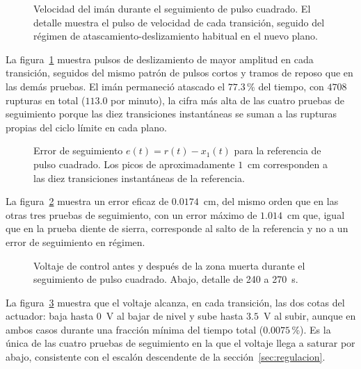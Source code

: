 \begin{figure}[ht]
    \centering
    
    \caption[Seguimiento pulso cuadrado: velocidad]{Velocidad del imán durante el seguimiento de pulso cuadrado. El detalle muestra el pulso de velocidad de cada transición, seguido del régimen de atascamiento-deslizamiento habitual en el nuevo plano.}
    \label{fig:pulso_vel}
\end{figure}

La figura~\ref{fig:pulso_vel} muestra pulsos de deslizamiento de mayor amplitud en cada transición, seguidos del mismo patrón de pulsos cortos y tramos de reposo que en las demás pruebas. El imán permaneció atascado el $77.3$\,\% del tiempo, con $4708$ rupturas en total ($113.0$ por minuto), la cifra más alta de las cuatro pruebas de seguimiento porque las diez transiciones instantáneas se suman a las rupturas propias del ciclo límite en cada plano.

\FloatBarrier

\begin{figure}[ht]
    \centering
    
    \caption[Seguimiento pulso cuadrado: error]{Error de seguimiento $e(t)=r(t)-x_1(t)$ para la referencia de pulso cuadrado. Los picos de aproximadamente $1$~cm corresponden a las diez transiciones instantáneas de la referencia.}
    \label{fig:pulso_error}
\end{figure}

La figura~\ref{fig:pulso_error} muestra un error eficaz de $0.0174$~cm, del mismo orden que en las otras tres pruebas de seguimiento, con un error máximo de $1.014$~cm que, igual que en la prueba diente de sierra, corresponde al salto de la referencia y no a un error de seguimiento en régimen.

\FloatBarrier

\begin{figure}[ht]
    \centering
    
    \caption[Seguimiento pulso cuadrado: señal de control]{Voltaje de control antes y después de la zona muerta durante el seguimiento de pulso cuadrado. Abajo, detalle de 240 a 270~s.}
    \label{fig:pulso_ctrl}
\end{figure}

La figura~\ref{fig:pulso_ctrl} muestra que el voltaje alcanza, en cada transición, las dos cotas del actuador: baja hasta $0$~V al bajar de nivel y sube hasta $3.5$~V al subir, aunque en ambos casos durante una fracción mínima del tiempo total ($0.0075$\,\%). Es la única de las cuatro pruebas de seguimiento en la que el voltaje llega a saturar por abajo, consistente con el escalón descendente de la sección~\ref{sec:regulacion}.


